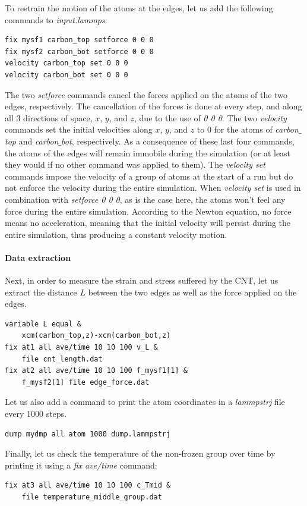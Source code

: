 \documentclass[9pt,tutorial]{livecoms}
\begin{document}
To restrain the motion of the atoms at the edges, let us add the following commands to \textit{input.lammps}:
{\normalsize \begin{verbatim}
fix mysf1 carbon_top setforce 0 0 0
fix mysf2 carbon_bot setforce 0 0 0
velocity carbon_top set 0 0 0
velocity carbon_bot set 0 0 0
\end{verbatim}}
The two \textit{setforce} commands cancel the forces applied on the atoms of the two edges, respectively. The cancellation of the forces
is done at every step, and along all 3 directions of space, $x$, $y$, and $z$, due to the use of \textit{0 0 0}. The two \textit{velocity} commands set the initial velocities along $x$, $y$, and $z$ to 0 for the atoms of \textit{carbon$\_$top} and \textit{carbon$\_$bot}, respectively. As a consequence of these last four commands, the atoms of the edges will remain immobile during the simulation (or at least they would if no other command was applied to them). The \textit{velocity set} commands impose the velocity of a group of atoms at the start of a run but do not enforce the velocity during the entire simulation. When \textit{velocity set} is used in combination with \textit{setforce 0 0 0}, as is the case here, the atoms won't feel any force during the entire simulation. According to the Newton equation, no force means no acceleration, meaning that the initial velocity will persist during the entire simulation, thus producing a constant velocity motion.

\paragraph{Data extraction}
Next, in order to measure the strain and stress suffered by the CNT, let us extract the distance $L$ between the two edges as well as the force applied on the edges.
{\normalsize \begin{verbatim}
variable L equal &
    xcm(carbon_top,z)-xcm(carbon_bot,z)
fix at1 all ave/time 10 10 100 v_L &
    file cnt_length.dat
fix at2 all ave/time 10 10 100 f_mysf1[1] &
    f_mysf2[1] file edge_force.dat
\end{verbatim}}
\noindent Let us also add a command to print the atom coordinates in a \textit{lammpstrj} file every 1000 steps.
{\normalsize \begin{verbatim}
dump mydmp all atom 1000 dump.lammpstrj
\end{verbatim}}
\noindent Finally, let us check the temperature of the non-frozen group over time by printing it using a \textit{fix ave/time} command:
{\normalsize \begin{verbatim}
fix at3 all ave/time 10 10 100 c_Tmid &
    file temperature_middle_group.dat
\end{verbatim}}
\end{document}
